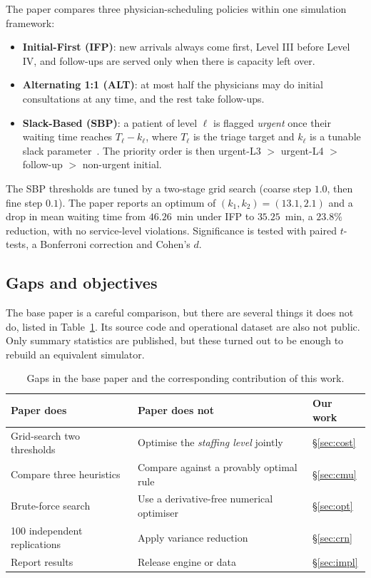 \documentclass[sigconf,nonacm]{acmart}
\begin{document}
The paper compares three physician-scheduling policies within one simulation
framework:

\begin{itemize}
\item \textbf{Initial-First (IFP)}: new arrivals always come first, Level III
      before Level IV, and follow-ups are served only when there is capacity
      left over.
\item \textbf{Alternating 1:1 (ALT)}: at most half the physicians may do
      initial consultations at any time, and the rest take follow-ups.
\item \textbf{Slack-Based (SBP)}: a patient of level $\ell$ is flagged
      \emph{urgent} once their waiting time reaches $T_\ell - k_\ell$, where
      $T_\ell$ is the triage target and $k_\ell$ is a tunable slack
      parameter~\cite{davenport2001slack}. The priority order is then
      urgent-L3 $>$ urgent-L4 $>$ follow-up $>$ non-urgent initial.
\end{itemize}

The SBP thresholds are tuned by a two-stage grid search (coarse step $1.0$,
then fine step $0.1$). The paper reports an optimum of $(k_1,k_2)=(13.1,2.1)$
and a drop in mean waiting time from $46.26$~min under IFP to $35.25$~min, a
$23.8\%$ reduction, with no service-level violations. Significance is tested
with paired $t$-tests, a Bonferroni correction and Cohen's $d$.

\subsection{Gaps and objectives}
The base paper is a careful comparison, but there are several things it does
not do, listed in Table~\ref{tab:gaps}. Its source code and operational dataset
are also not public. Only summary statistics are published, but these turned
out to be enough to rebuild an equivalent simulator.

\begin{table}[t]
\caption{Gaps in the base paper and the corresponding contribution of this work.}
\label{tab:gaps}
\small
\begin{tabular}{@{}p{2.9cm}p{2.9cm}p{1.6cm}@{}}
\toprule
\textbf{Paper does} & \textbf{Paper does not} & \textbf{Our work} \\
\midrule
Grid-search two thresholds & Optimise the \emph{staffing level} jointly & \S\ref{sec:cost} \\
Compare three heuristics & Compare against a provably optimal rule & \S\ref{sec:cmu} \\
Brute-force search & Use a derivative-free numerical optimiser & \S\ref{sec:opt} \\
100 independent replications & Apply variance reduction & \S\ref{sec:crn} \\
Report results & Release engine or data & \S\ref{sec:impl} \\
\bottomrule
\end{tabular}
\end{table}
\end{document}
